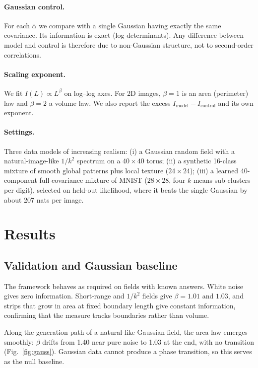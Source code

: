\documentclass[10pt,twocolumn,a4paper]{article}
\newcommand{\ab}{\bar\alpha}
\begin{document}
\paragraph{Gaussian control.} For each $\ab$ we compare with a single Gaussian having exactly the same covariance. Its information is exact (log-determinants). Any difference between model and control is therefore due to non-Gaussian structure, not to second-order correlations.

\paragraph{Scaling exponent.} We fit $I(L)\propto L^{\beta}$ on log--log axes. For 2D images, $\beta=1$ is an area (perimeter) law and $\beta=2$ a volume law. We also report the excess $I_{\text{model}}-I_{\text{control}}$ and its own exponent.

\paragraph{Settings.} Three data models of increasing realism: (i) a Gaussian random field with a natural-image-like $1/k^2$ spectrum on a $40\times40$ torus; (ii) a synthetic 16-class mixture of smooth global patterns plus local texture ($24\times24$); (iii) a learned 40-component full-covariance mixture of MNIST ($28\times28$, four $k$-means sub-clusters per digit), selected on held-out likelihood, where it beats the single Gaussian by about 207 nats per image.

\section{Results}
\subsection{Validation and Gaussian baseline}
The framework behaves as required on fields with known answers. White noise gives zero information. Short-range and $1/k^2$ fields give $\beta=1.01$ and $1.03$, and strips that grow in area at fixed boundary length give constant information, confirming that the measure tracks boundaries rather than volume.

Along the generation path of a natural-like Gaussian field, the area law emerges smoothly: $\beta$ drifts from 1.40 near pure noise to 1.03 at the end, with no transition (Fig.~\ref{fig:gauss}). Gaussian data cannot produce a phase transition, so this serves as the null baseline.
\end{document}
